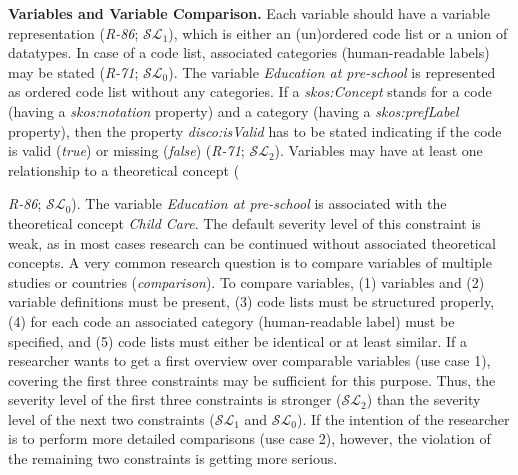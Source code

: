 \documentclass{llncs}
\begin{document}
{\textbf{Variables and Variable Comparison.}
Each variable should have a variable representation (\emph{R-86}; $\mathcal{SL}_{1}$), which is either an (un)ordered code list or a union of datatypes.
In case of a code list, associated categories (human-readable labels) may be stated (\emph{R-71}; $\mathcal{SL}_{0}$).
The variable \emph{Education at pre-school} is represented as ordered code list without any categories.
If a {\em skos:Concept} stands for a code (having a {\em skos:notation} property) and a category (having a {\em skos:prefLabel} property), 
then the property {\em disco:isValid} has to be stated indicating if the code is valid (\emph{true}) or missing (\emph{false}) (\emph{R-71}; $\mathcal{SL}_{2}$).
Variables may have at least one relationship to a theoretical concept ({\emph{R-86}; $\mathcal{SL}_{0}$).
The variable \emph{Education at pre-school} is associated with the theoretical concept \emph{Child Care}. 
The default severity level of this constraint is weak, as in most cases research can be continued without associated theoretical concepts.
A very common research question is to compare variables of multiple studies or countries (\emph{comparison}).
To compare variables, 
(1) variables and (2) variable definitions must be present,
(3) code lists must be structured properly,
(4) for each code an associated category (human-readable label) must be specified, and
(5) code lists must either be identical or at least similar.
If a researcher wants to get a first overview over comparable variables (use case 1), 
covering the first three constraints may be sufficient for this purpose.
Thus, the severity level of the first three constraints is stronger ($\mathcal{SL}_{2}$) than the severity level of the next two constraints ($\mathcal{SL}_{1}$ and $\mathcal{SL}_{0}$).
If the intention of the researcher is to perform more detailed comparisons (use case 2), however, the violation of the remaining two constraints is getting more serious.

}}
\end{document}
